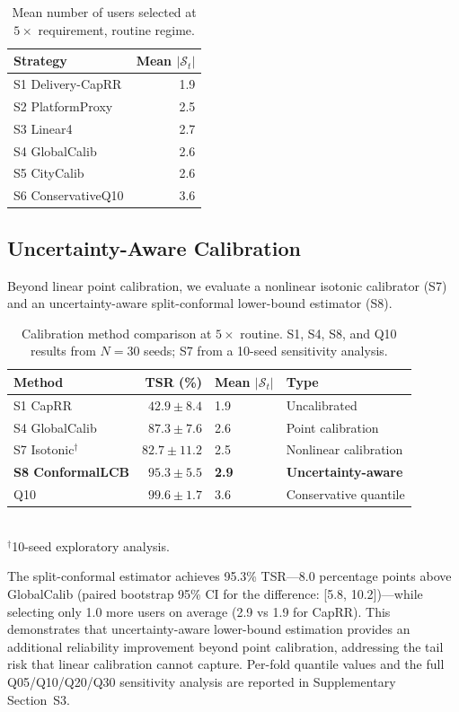 \documentclass[utf8]{FrontiersinHarvard}
\begin{document}
\begin{table}[h!]
\centering
\caption{Mean number of users selected at $5\times$ requirement,
routine regime.}
\label{tab:nselected}
\begin{tabular}{lr}
\toprule
\textbf{Strategy} & \textbf{Mean $|\mathcal{S}_t|$} \\
\midrule
S1 Delivery-CapRR & 1.9 \\
S2 PlatformProxy & 2.5 \\
S3 Linear4 & 2.7 \\
S4 GlobalCalib & 2.6 \\
S5 CityCalib & 2.6 \\
S6 ConservativeQ10 & 3.6 \\
\bottomrule
\end{tabular}
\end{table}

\subsection{Uncertainty-Aware Calibration}

Beyond linear point calibration, we evaluate a nonlinear
isotonic calibrator (S7) and an uncertainty-aware
split-conformal lower-bound estimator (S8).

\begin{table}[h!]
\centering
\caption{Calibration method comparison at $5\times$ routine.
S1, S4, S8, and Q10 results from $N=30$ seeds; S7 from a
10-seed sensitivity analysis.}
\label{tab:calib_sensitivity}
\begin{tabular}{lrll}
\toprule
\textbf{Method} & \textbf{TSR (\%)} & \textbf{Mean $|\mathcal{S}_t|$} & \textbf{Type} \\
\midrule
S1 CapRR & $42.9 \pm 8.4$ & 1.9 & Uncalibrated \\
S4 GlobalCalib & $87.3 \pm 7.6$ & 2.6 & Point calibration \\
S7 Isotonic$^{\dagger}$ & $82.7 \pm 11.2$ & 2.5 & Nonlinear calibration \\
\textbf{S8 ConformalLCB} & $\mathbf{95.3 \pm 5.5}$ & \textbf{2.9} & \textbf{Uncertainty-aware} \\
Q10 & $99.6 \pm 1.7$ & 3.6 & Conservative quantile \\
\bottomrule
\end{tabular}
\\[2pt]
\footnotesize $^{\dagger}$10-seed exploratory analysis.
\end{table}

The split-conformal estimator achieves 95.3\% TSR---8.0
percentage points above GlobalCalib (paired bootstrap 95\% CI
for the difference: [5.8, 10.2])---while selecting only
1.0 more users on average (2.9 vs 1.9 for CapRR). This
demonstrates that uncertainty-aware lower-bound estimation
provides an additional reliability improvement beyond point
calibration, addressing the tail risk that linear calibration
cannot capture. Per-fold quantile values and the full
Q05/Q10/Q20/Q30 sensitivity analysis are reported in
Supplementary Section~S3.
\end{document}
